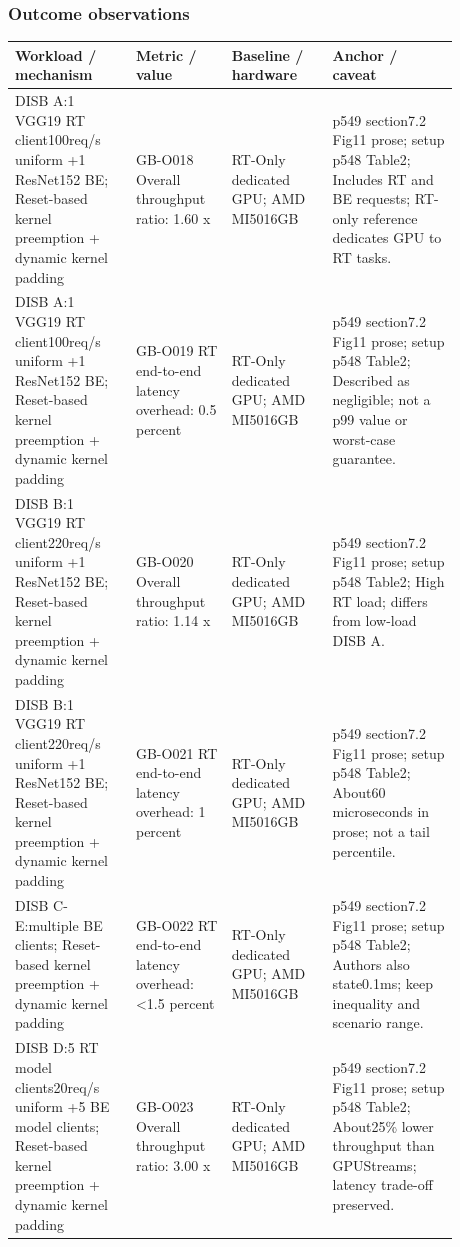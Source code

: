 \documentclass[12pt,a4paper]{article}
\begin{document}
\subsubsection*{Outcome observations}
\begin{longtable}{p{0.24\linewidth}p{0.19\linewidth}p{0.2\linewidth}p{0.25\linewidth}}
\toprule
Workload /\allowbreak{} mechanism & Metric /\allowbreak{} value & Baseline /\allowbreak{} hardware & Anchor /\allowbreak{} caveat\\\midrule
\endhead
DISB A:1 VGG19 RT client100req/\allowbreak{}s uniform +1 ResNet152 BE; Reset-based kernel preemption + dynamic kernel padding & GB-O018 Overall throughput ratio: 1.60 x & RT-Only dedicated GPU; AMD MI5016GB & p549 section7.2 Fig11 prose; setup p548 Table2; Includes RT and BE requests; RT-only reference dedicates GPU to RT tasks.\\
DISB A:1 VGG19 RT client100req/\allowbreak{}s uniform +1 ResNet152 BE; Reset-based kernel preemption + dynamic kernel padding & GB-O019 RT end-to-end latency overhead: 0.5 percent & RT-Only dedicated GPU; AMD MI5016GB & p549 section7.2 Fig11 prose; setup p548 Table2; Described as negligible; not a p99 value or worst-case guarantee.\\
DISB B:1 VGG19 RT client220req/\allowbreak{}s uniform +1 ResNet152 BE; Reset-based kernel preemption + dynamic kernel padding & GB-O020 Overall throughput ratio: 1.14 x & RT-Only dedicated GPU; AMD MI5016GB & p549 section7.2 Fig11 prose; setup p548 Table2; High RT load; differs from low-load DISB A.\\
DISB B:1 VGG19 RT client220req/\allowbreak{}s uniform +1 ResNet152 BE; Reset-based kernel preemption + dynamic kernel padding & GB-O021 RT end-to-end latency overhead: 1 percent & RT-Only dedicated GPU; AMD MI5016GB & p549 section7.2 Fig11 prose; setup p548 Table2; About60 microseconds in prose; not a tail percentile.\\
DISB C-E:multiple BE clients; Reset-based kernel preemption + dynamic kernel padding & GB-O022 RT end-to-end latency overhead: <1.5 percent & RT-Only dedicated GPU; AMD MI5016GB & p549 section7.2 Fig11 prose; setup p548 Table2; Authors also state0.1ms; keep inequality and scenario range.\\
DISB D:5 RT model clients20req/\allowbreak{}s uniform +5 BE model clients; Reset-based kernel preemption + dynamic kernel padding & GB-O023 Overall throughput ratio: 3.00 x & RT-Only dedicated GPU; AMD MI5016GB & p549 section7.2 Fig11 prose; setup p548 Table2; About25\% lower throughput than GPUStreams; latency trade-off preserved.\\

\end{longtable}
\end{document}
